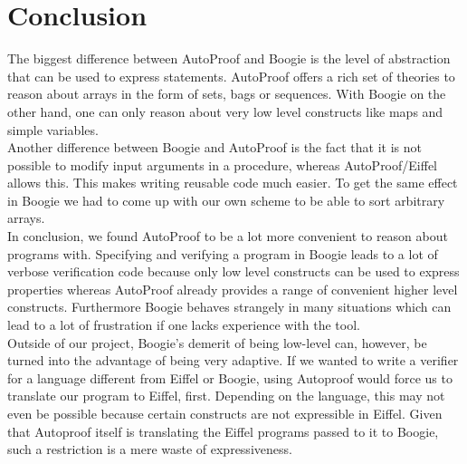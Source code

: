 \section{Conclusion}
\label{sec:conclusion}
The biggest difference between AutoProof and Boogie is the level of abstraction that can be 
used to express statements. AutoProof offers a rich set of theories to reason about arrays in the
form of sets, bags or sequences. With Boogie on the other hand, one can only reason about very 
low level constructs like maps and simple variables.\\

Another difference between Boogie and AutoProof is the fact that it is not possible to modify
input arguments in a procedure, whereas AutoProof/Eiffel allows this. This makes writing reusable code
much easier. To get the same effect in Boogie we had to come up with our own scheme to be able to sort arbitrary arrays.\\

In conclusion, we found AutoProof to be a lot more convenient to reason about programs with. Specifying and verifying a program in Boogie leads to a lot of verbose verification code because only low level constructs can be used to express properties whereas AutoProof already provides a range of convenient higher level constructs. 
Furthermore Boogie behaves strangely in many situations which can lead to a lot of frustration if one lacks experience with the tool.\\

Outside of our project, Boogie's demerit of being low-level can, however, be turned into the advantage of being very adaptive. If we wanted to write a verifier for a language different from Eiffel or Boogie, using Autoproof would force us to translate our program to Eiffel, first. Depending on the language, this may not even be possible because certain constructs are not expressible in Eiffel. Given that Autoproof itself is translating the Eiffel programs passed to it to Boogie\cite{autoproofPaper}, such a restriction is a mere waste of expressiveness.\\

